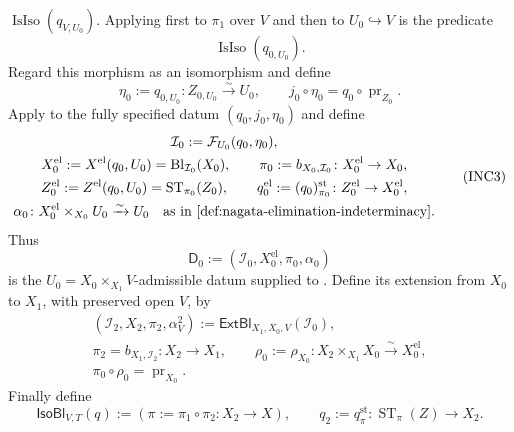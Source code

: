 \begin{definition}
  $\operatorname{IsIso}(q_{V,U_0})$.  Applying
   first to $\pi_1$ over $V$
  and then to $U_0\hookrightarrow V$ is the predicate
  \[
    \operatorname{IsIso}(q_{0,U_0}).                              \tag{INC1}
  \]
  Regard this morphism as an isomorphism and define
  \[
    \eta_0:=q_{0,U_0}\colon Z_{0,U_0}\xrightarrow{\sim}U_0,
    \qquad
    j_0\circ\eta_0=q_0\circ\operatorname{pr}_{Z_0}.              \tag{INC2}
  \]
  Apply  to the fully specified
  datum $(q_0,j_0,\eta_0)$ and define
  \[
  \begin{gathered}
    \mathcal I_0:=\mathcal F_{U_0}(q_0,\eta_0),\\
    X_0^{\mathrm{el}}:=X^{\mathrm{el}}(q_0,U_0)
      =\operatorname{Bl}_{\mathcal I_0}(X_0),\qquad
    \pi_0:=b_{X_0,\mathcal I_0}\colon X_0^{\mathrm{el}}\to X_0,\\
    Z_0^{\mathrm{el}}:=Z^{\mathrm{el}}(q_0,U_0)
      =\operatorname{ST}_{\pi_0}(Z_0),\qquad
    q_0^{\mathrm{el}}:=(q_0)^{\mathrm{st}}_{\pi_0}
      \colon Z_0^{\mathrm{el}}\to X_0^{\mathrm{el}},\\
    \alpha_0\colon X_0^{\mathrm{el}}\times_{X_0}U_0
      \xrightarrow{\sim}U_0
      \quad\text{as in \Cref{def:nagata-elimination-indeterminacy}}.
  \end{gathered}                                                    \tag{INC3}
  \]
  Thus
  \[
    \mathsf D_0:=(\mathcal I_0,X_0^{\mathrm{el}},\pi_0,\alpha_0)
  \]
  is the $U_0=X_0\times_{X_1}V$-admissible datum supplied to
  .  Define its extension from
  $X_0$ to $X_1$, with preserved open $V$, by
  \[
  \begin{gathered}
    (\mathcal I_2,X_2,\pi_2,\alpha_V^2)
      :=\mathsf{ExtBl}_{X_1,X_0,V}(\mathcal I_0),\\
    \pi_2=b_{X_1,\mathcal I_2}\colon X_2\to X_1,\qquad
    \rho_0:=\rho_{X_0}\colon
      X_2\times_{X_1}X_0\xrightarrow{\sim}X_0^{\mathrm{el}},\\
    \pi_0\circ\rho_0=\operatorname{pr}_{X_0}.
  \end{gathered}                                                    \tag{INC4}
  \]
  Finally define
  \[
    \mathsf{IsoBl}_{V,T}(q)
      :=(\pi:=\pi_1\circ\pi_2\colon X_2\to X),
    \qquad
    q_2:=q^{\mathrm{st}}_\pi\colon
      \operatorname{ST}_\pi(Z)\to X_2.
  \]
\end{definition}

